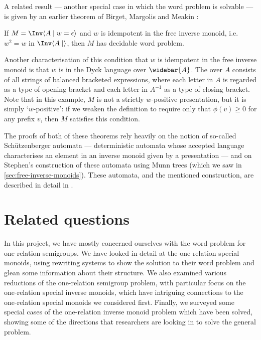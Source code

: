 \documentclass[noindex,noinsetproof,emphthm,12pt]{lmaths}
\newcommand{\Abar}{\widebar{A}}
\begin{document}
A related result --- another special case in which the word problem is solvable --- is given by an earlier theorem of Birget, Margolis and Meakin \cite{Birget1994}:
\begin{theorem}
	If $M = \Inv \langle A \mid w = \epsilon\rangle$ and $w$ is idempotent in the free inverse monoid, i.e. $w^2 = w$ in $\Inv \langle A \mid \rangle$, then $M$ has decidable word problem. \label{thm:idempotent-generated-WP-decidable}
\end{theorem}
Another characterisation of this condition that $w$ is idempotent in the free inverse monoid is that $w$ is in the Dyck language over $\Abar$. The  over $A$ consists of all strings of balanced bracketed expressions, where each letter in $A$ is regarded as a type of opening bracket and each letter in $A^{-1}$ as a type of closing bracket.
Note that in this example, $M$ is not a strictly $w$-positive presentation, but it is simply `$w$-positive': if we weaken the definition to require only that $\phi(v) \ge 0$ for any prefix $v$, then $M$ satisfies this condition.

The proofs of both of these theorems rely heavily on the notion of so-called Schützenberger automata --- deterministic automata whose accepted language characterises an element in an inverse monoid given by a presentation --- and on Stephen's construction of these automata using Munn trees (which we saw in \cref{sec:free-inverse-monoids}). These automata, and the mentioned construction, are described in detail in \cite{Stephen1990}.

\section{Related questions} \label{sec:related-questions}
In this project, we have mostly concerned ourselves with the word problem for one-relation semigroups. We have looked in detail at the one-relation special monoids, using rewriting systems to show the solution to their word problem and glean some information about their structure. We also examined various reductions of the one-relation semigroup problem, with particular focus on the one-relation special inverse monoids, which have intriguing connections to the one-relation special monoids we considered first. Finally, we surveyed some special cases of the one-relation inverse monoid problem which have been solved, showing some of the directions that researchers are looking in to solve the general problem.
\end{document}
